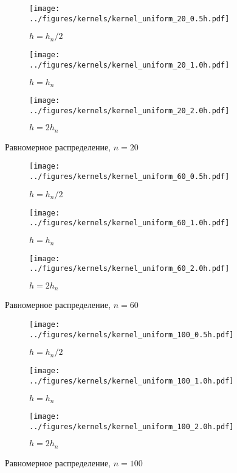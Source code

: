 \documentclass[12pt]{article}
\begin{document}
	\begin{figure}[H]
		\centering
		\begin{subfigure}[t]{.3\linewidth}
			\centering\texttt{[image: ../figures/kernels/kernel\_uniform\_20\_0.5h.pdf]}
			\caption*{$h = h_n/2$}
		\end{subfigure}
		\begin{subfigure}[t]{.3\linewidth}
			\centering\texttt{[image: ../figures/kernels/kernel\_uniform\_20\_1.0h.pdf]}
			\caption*{$h = h_n$}
		\end{subfigure}
		\begin{subfigure}[t]{.3\linewidth}
			\centering\texttt{[image: ../figures/kernels/kernel\_uniform\_20\_2.0h.pdf]}
			\caption*{$h = 2h_n$}
		\end{subfigure}
		\caption{Равномерное распределение, $n = 20$}
	\end{figure}
	\begin{figure}[H]
		\centering
		\begin{subfigure}[t]{.3\linewidth}
			\centering\texttt{[image: ../figures/kernels/kernel\_uniform\_60\_0.5h.pdf]}
			\caption*{$h = h_n/2$}
		\end{subfigure}
		\begin{subfigure}[t]{.3\linewidth}
			\centering\texttt{[image: ../figures/kernels/kernel\_uniform\_60\_1.0h.pdf]}
			\caption*{$h = h_n$}
		\end{subfigure}
		\begin{subfigure}[t]{.3\linewidth}
			\centering\texttt{[image: ../figures/kernels/kernel\_uniform\_60\_2.0h.pdf]}
			\caption*{$h = 2h_n$}
		\end{subfigure}
		\caption{Равномерное распределение, $n = 60$}
	\end{figure}
	\begin{figure}[H]
		\centering
		\begin{subfigure}[t]{.3\linewidth}
			\centering\texttt{[image: ../figures/kernels/kernel\_uniform\_100\_0.5h.pdf]}
			\caption*{$h = h_n/2$}
		\end{subfigure}
		\begin{subfigure}[t]{.3\linewidth}
			\centering\texttt{[image: ../figures/kernels/kernel\_uniform\_100\_1.0h.pdf]}
			\caption*{$h = h_n$}
		\end{subfigure}
		\begin{subfigure}[t]{.3\linewidth}
			\centering\texttt{[image: ../figures/kernels/kernel\_uniform\_100\_2.0h.pdf]}
			\caption*{$h = 2h_n$}
		\end{subfigure}
		\caption{Равномерное распределение, $n = 100$}
	\end{figure}
	
\end{document}

